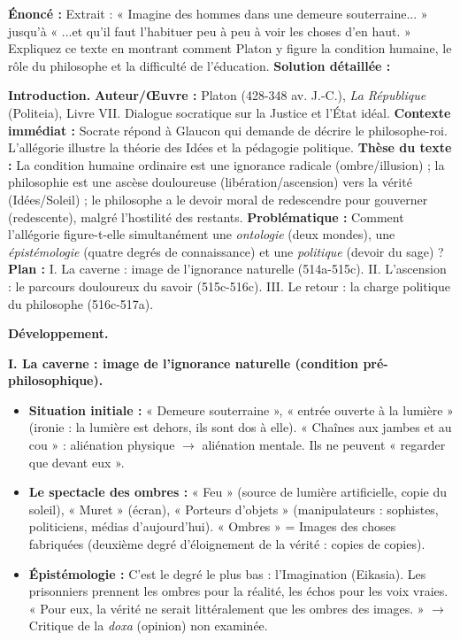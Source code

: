 \documentclass[11pt]{article}
\newcommand{\cle}[1]{{\popxbold\color{popdark}#1}}
\begin{document}
\begin{exoresolu}
\textbf{Énoncé :} Extrait : « Imagine des hommes dans une demeure souterraine... » jusqu'à « ...et qu'il faut l'habituer peu à peu à voir les choses d'en haut. » Expliquez ce texte en montrant comment Platon y figure la condition humaine, le rôle du philosophe et la difficulté de l'éducation.
\tcblower
\textbf{Solution détaillée :}

\textbf{Introduction.}
\textbf{Auteur/Œuvre :} Platon (428-348 av. J.-C.), \emph{La République} (Politeia), Livre VII. Dialogue socratique sur la Justice et l'État idéal.
\textbf{Contexte immédiat :} Socrate répond à Glaucon qui demande de décrire le philosophe-roi. L'allégorie illustre la théorie des Idées et la pédagogie politique.
\textbf{Thèse du texte :} La condition humaine ordinaire est une ignorance radicale (ombre/illusion) ; la philosophie est une ascèse douloureuse (libération/ascension) vers la vérité (Idées/Soleil) ; le philosophe a le devoir moral de redescendre pour gouverner (redescente), malgré l'hostilité des restants.
\textbf{Problématique :} Comment l'allégorie figure-t-elle simultanément une \emph{ontologie} (deux mondes), une \emph{épistémologie} (quatre degrés de connaissance) et une \emph{politique} (devoir du sage) ?
\textbf{Plan :} I. La caverne : image de l'ignorance naturelle (514a-515c). II. L'ascension : le parcours douloureux du savoir (515c-516c). III. Le retour : la charge politique du philosophe (516c-517a).

\textbf{Développement.}

\textbf{I. La caverne : image de l'ignorance naturelle (condition pré-philosophique).}
\begin{itemize}
    \item \textbf{Situation initiale :} « Demeure souterraine », « entrée ouverte à la lumière » (ironie : la lumière est dehors, ils sont dos à elle). « Chaînes aux jambes et au cou » : aliénation physique $\rightarrow$ aliénation mentale. Ils ne peuvent « regarder que devant eux ».
    \item \textbf{Le spectacle des ombres :} « Feu » (source de lumière artificielle, copie du soleil), « Muret » (écran), « Porteurs d'objets » (manipulateurs : sophistes, politiciens, médias d'aujourd'hui). « Ombres » = \cle{Images des choses fabriquées} (deuxième degré d'éloignement de la vérité : copies de copies).
    \item \textbf{Épistémologie :} C'est le degré le plus bas : l'\cle{Imagination (Eikasia)}. Les prisonniers prennent les ombres pour la réalité, les échos pour les voix vraies. « Pour eux, la vérité ne serait littéralement que les ombres des images. » $\rightarrow$ Critique de la \emph{doxa} (opinion) non examinée.
\end{itemize}


\end{exoresolu}
\end{document}
